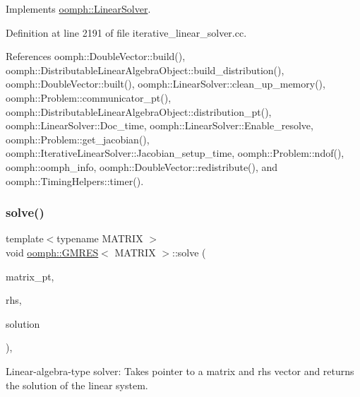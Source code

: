 Implements \hyperlink{classoomph_1_1LinearSolver_a15ce22542b74ed1826ea485edacbeb6e}{oomph\+::\+Linear\+Solver}.



Definition at line 2191 of file iterative\+\_\+linear\+\_\+solver.\+cc.



References oomph\+::\+Double\+Vector\+::build(), oomph\+::\+Distributable\+Linear\+Algebra\+Object\+::build\+\_\+distribution(), oomph\+::\+Double\+Vector\+::built(), oomph\+::\+Linear\+Solver\+::clean\+\_\+up\+\_\+memory(), oomph\+::\+Problem\+::communicator\+\_\+pt(), oomph\+::\+Distributable\+Linear\+Algebra\+Object\+::distribution\+\_\+pt(), oomph\+::\+Linear\+Solver\+::\+Doc\+\_\+time, oomph\+::\+Linear\+Solver\+::\+Enable\+\_\+resolve, oomph\+::\+Problem\+::get\+\_\+jacobian(), oomph\+::\+Iterative\+Linear\+Solver\+::\+Jacobian\+\_\+setup\+\_\+time, oomph\+::\+Problem\+::ndof(), oomph\+::oomph\+\_\+info, oomph\+::\+Double\+Vector\+::redistribute(), and oomph\+::\+Timing\+Helpers\+::timer().

\mbox{\label{classoomph_1_1GMRES_ab61100de9df6d717e50548b034491a9b}} 
\subsubsection{\texorpdfstring{solve()}{solve()}\hspace{0.1cm}{\footnotesize\ttfamily [2/3]}}
{\footnotesize\ttfamily template$<$typename M\+A\+T\+R\+IX $>$ \\
void \hyperlink{classoomph_1_1GMRES}{oomph\+::\+G\+M\+R\+ES}$<$ M\+A\+T\+R\+IX $>$\+::solve (\begin{DoxyParamCaption}\item[{\hyperlink{classoomph_1_1DoubleMatrixBase}{Double\+Matrix\+Base} $\ast$const \&}]{matrix\+\_\+pt,  }\item[{const \hyperlink{classoomph_1_1DoubleVector}{Double\+Vector} \&}]{rhs,  }\item[{\hyperlink{classoomph_1_1DoubleVector}{Double\+Vector} \&}]{solution }\end{DoxyParamCaption})\hspace{0.3cm}{\ttfamily [inline]}, {\ttfamily [virtual]}}



Linear-\/algebra-\/type solver\+: Takes pointer to a matrix and rhs vector and returns the solution of the linear system. 



